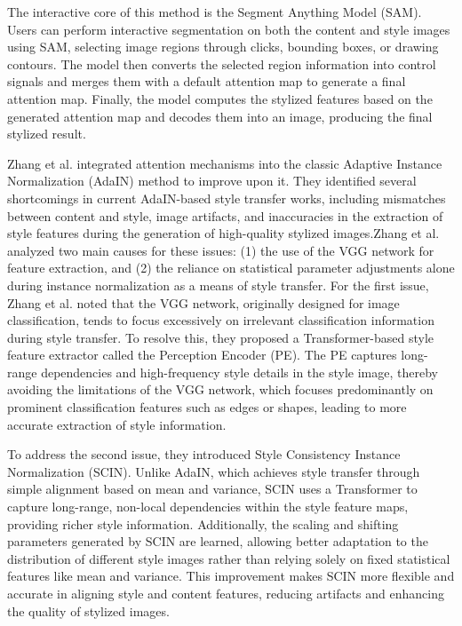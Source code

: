 \documentclass[preprint,12pt]{elsarticle}
\begin{document}
The interactive core of this method is the Segment Anything Model (SAM). Users can perform interactive segmentation on both the content and style images using SAM, selecting image regions through clicks, bounding boxes, or drawing contours. The model then converts the selected region information into control signals and merges them with a default attention map to generate a final attention map. Finally, the model computes the stylized features based on the generated attention map and decodes them into an image, producing the final stylized result.

Zhang et al.\citep{51zhang2024rethink} integrated attention mechanisms into the classic Adaptive Instance Normalization (AdaIN)\citep{04huang2017arbitrary} method to improve upon it. They identified several shortcomings in current AdaIN-based\citep{04huang2017arbitrary} style transfer works, including mismatches between content and style, image artifacts, and inaccuracies in the extraction of style features during the generation of high-quality stylized images.Zhang et al.\citep{51zhang2024rethink} analyzed two main causes for these issues: (1) the use of the VGG network for feature extraction, and (2) the reliance on statistical parameter adjustments alone during instance normalization as a means of style transfer.
For the first issue, Zhang et al.\citep{51zhang2024rethink} noted that the VGG network, originally designed for image classification, tends to focus excessively on irrelevant classification information during style transfer. To resolve this, they proposed a Transformer-based style feature extractor called the Perception Encoder (PE). The PE captures long-range dependencies and high-frequency style details in the style image, thereby avoiding the limitations of the VGG network, which focuses predominantly on prominent classification features such as edges or shapes, leading to more accurate extraction of style information.

To address the second issue, they introduced Style Consistency Instance Normalization (SCIN). Unlike AdaIN, which achieves style transfer through simple alignment based on mean and variance, SCIN uses a Transformer to capture long-range, non-local dependencies within the style feature maps, providing richer style information. Additionally, the scaling and shifting parameters generated by SCIN are learned, allowing better adaptation to the distribution of different style images rather than relying solely on fixed statistical features like mean and variance. This improvement makes SCIN more flexible and accurate in aligning style and content features, reducing artifacts and enhancing the quality of stylized images.
\end{document}
